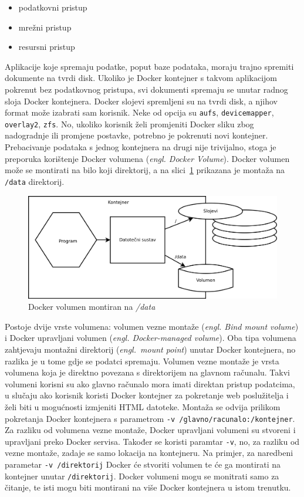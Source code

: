 \begin{itemize}
        \item podatkovni pristup
        \item mrežni pristup
        \item resursni pristup
\end{itemize}

Aplikacije koje spremaju podatke, poput baze podataka, moraju trajno spremiti dokumente na tvrdi
disk. Ukoliko je Docker kontejner s takvom aplikacijom pokrenut bez podatkovnog pristupa, svi
dokumenti spremaju se unutar radnog sloja Docker kontejnera. Docker slojevi spremljeni su na tvrdi
disk, a njihov format može izabrati sam korisnik. Neke od opcija su \texttt{aufs},
\texttt{devicemapper}, \texttt{overlay2}, \texttt{zfs}. No, ukoliko korisnik želi promjeniti Docker
sliku zbog nadogradnje ili promjene postavke, potrebno je pokrenuti novi kontejner. Prebacivanje
podataka s jednog kontejnera na drugi nije trivijalno, stoga je preporuka korištenje Docker volumena
(\textit{engl. Docker Volume}). Docker volumen može se montirati na bilo koji direktorij, a na
slici~\ref{fig:02docker_volume} prikazana je montaža na \texttt{/data} direktorij.

\begin{figure}[h]
    \centering
    \includegraphics[width=\textwidth]{img/02/docker_volume.png}
    \caption{Docker volumen montiran na \textit{/data}}%
    \label{fig:02docker_volume}
\end{figure}

Postoje dvije vrste volumena: volumen vezne montaže (\textit{engl. Bind mount volume}) i Docker
upravljani volumen (\textit{engl. Docker-managed volume}). Oba tipa volumena zahtjevaju montažni
direktorij (\textit{engl.~mount point}) unutar Docker kontejnera, no razlika je u tome gdje se
podatci spremaju. Volumen vezne montaže je vrsta volumena koja je direktno povezana s direktorijem
na glavnom računalu. Takvi volumeni korisni su ako glavno računalo mora imati direktan pristup
podatcima, u slučaju ako korisnik koristi Docker kontejner za pokretanje web poslužitelja i želi
biti u mogućnosti izmjeniti HTML datoteke. Montaža se odvija prilikom pokretanja Docker kontejnera s
parametrom \texttt{-v /glavno/racunalo:/kontejner}. Za razliku od volumena vezne montaže, Docker
upravljani volumeni su stvoreni i upravljani preko Docker servisa. Također se koristi paramtar
\texttt{-v}, no, za razliku od vezne montaže, zadaje se samo lokacija na kontejneru. Na primjer, za
naredbeni parametar \texttt{-v /direktorij} Docker će stvoriti volumen te će ga montirati na
kontejner unutar \texttt{/direktorij}. Docker volumeni mogu se monitrati samo za čitanje, te isti
mogu biti montirani na više Docker kontejnera u istom trenutku.

